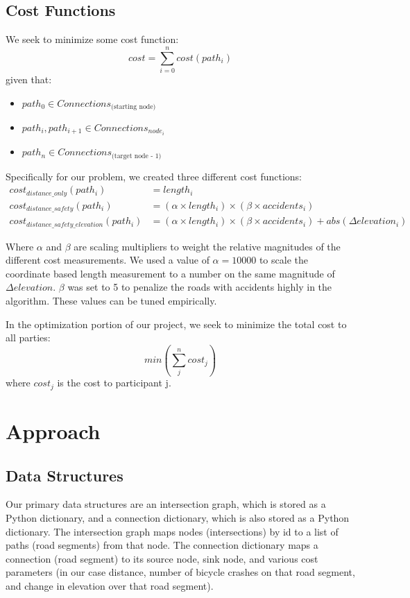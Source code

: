 \documentclass[11pt]{article}
\begin{document}
\subsection{Cost Functions}
We seek to minimize some cost function:
\begin{equation}
cost = \sum_{i=0}^n cost(path_i)
\end{equation}
given that:
\begin{itemize}
\item $path_0 \in Connections_{\text{(starting node)}}$
\item $path_i, path_{i+1} \in Connections_{node_i}$
\item $path_n \in Connections_{\text{(target node - 1)}}$
\end{itemize}

\noindent Specifically for our problem, we created three different cost functions:
\begin{align}\label{cost_fns}
cost_{distance\_only}(path_i) &= length_i \\
cost_{distance\_safety}(path_i) &= (\alpha \times length_i) \times  (\beta \times accidents_i) \\
cost_{distance\_safety\_elevation}(path_i) &= (\alpha \times length_i) \times  (\beta \times accidents_i) + abs(\Delta elevation_i)
\end{align}


\noindent Where $\alpha$ and $\beta$ are scaling multipliers to weight the relative magnitudes of the different cost measurements. We used a value of $\alpha = 10000$ to scale the coordinate based length measurement to a number on the same magnitude of $\Delta elevation$. $\beta$ was set to 5 to penalize the roads with accidents highly in the algorithm. These values can be tuned empirically.\par
\noindent In the optimization portion of our project, we seek to minimize the total cost to all parties:
\begin{equation}
min(\sum_j^n cost_j)
\end{equation}
where $cost_j$ is the cost to participant j.

\section{Approach}
\subsection{Data Structures}
Our primary data structures are an intersection graph, which is stored as a Python dictionary, and a connection dictionary, which is also stored as a Python dictionary. The intersection graph maps nodes (intersections) by id to a list of paths (road segments) from that node. The connection dictionary maps a connection (road segment) to its source node, sink node, and various cost parameters (in our case distance, number of bicycle crashes on that road segment, and change in elevation over that road segment).
\end{document}
